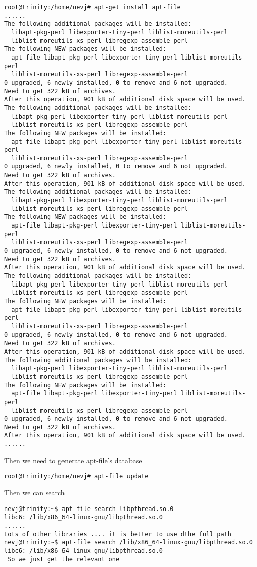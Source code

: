 \documentclass{article}  %
\begin{document}
\begin{verbatim}
root@trinity:/home/nevj# apt-get install apt-file
......
The following additional packages will be installed:
  libapt-pkg-perl libexporter-tiny-perl liblist-moreutils-perl
  liblist-moreutils-xs-perl libregexp-assemble-perl
The following NEW packages will be installed:
  apt-file libapt-pkg-perl libexporter-tiny-perl liblist-moreutils-perl
  liblist-moreutils-xs-perl libregexp-assemble-perl
0 upgraded, 6 newly installed, 0 to remove and 6 not upgraded.
Need to get 322 kB of archives.
After this operation, 901 kB of additional disk space will be used.
The following additional packages will be installed:
  libapt-pkg-perl libexporter-tiny-perl liblist-moreutils-perl
  liblist-moreutils-xs-perl libregexp-assemble-perl
The following NEW packages will be installed:
  apt-file libapt-pkg-perl libexporter-tiny-perl liblist-moreutils-perl
  liblist-moreutils-xs-perl libregexp-assemble-perl
0 upgraded, 6 newly installed, 0 to remove and 6 not upgraded.
Need to get 322 kB of archives.
After this operation, 901 kB of additional disk space will be used.
The following additional packages will be installed:
  libapt-pkg-perl libexporter-tiny-perl liblist-moreutils-perl
  liblist-moreutils-xs-perl libregexp-assemble-perl
The following NEW packages will be installed:
  apt-file libapt-pkg-perl libexporter-tiny-perl liblist-moreutils-perl
  liblist-moreutils-xs-perl libregexp-assemble-perl
0 upgraded, 6 newly installed, 0 to remove and 6 not upgraded.
Need to get 322 kB of archives.
After this operation, 901 kB of additional disk space will be used.
The following additional packages will be installed:
  libapt-pkg-perl libexporter-tiny-perl liblist-moreutils-perl
  liblist-moreutils-xs-perl libregexp-assemble-perl
The following NEW packages will be installed:
  apt-file libapt-pkg-perl libexporter-tiny-perl liblist-moreutils-perl
  liblist-moreutils-xs-perl libregexp-assemble-perl
0 upgraded, 6 newly installed, 0 to remove and 6 not upgraded.
Need to get 322 kB of archives.
After this operation, 901 kB of additional disk space will be used.
The following additional packages will be installed:
  libapt-pkg-perl libexporter-tiny-perl liblist-moreutils-perl
  liblist-moreutils-xs-perl libregexp-assemble-perl
The following NEW packages will be installed:
  apt-file libapt-pkg-perl libexporter-tiny-perl liblist-moreutils-perl
  liblist-moreutils-xs-perl libregexp-assemble-perl
0 upgraded, 6 newly installed, 0 to remove and 6 not upgraded.
Need to get 322 kB of archives.
After this operation, 901 kB of additional disk space will be used.
......
\end{verbatim}
Then we need to generate apt-file's database
\begin{verbatim}
root@trinity:/home/nevj# apt-file update
\end{verbatim}
Then we can search 
\begin{verbatim}
nevj@trinity:~$ apt-file search libpthread.so.0
libc6: /lib/x86_64-linux-gnu/libpthread.so.0
......
Lots of other libraries .... it is better to use dthe full path
nevj@trinity:~$ apt-file search /lib/x86_64-linux-gnu/libpthread.so.0
libc6: /lib/x86_64-linux-gnu/libpthread.so.0
 So we just get the relevant one
\end{verbatim}
\end{document}
